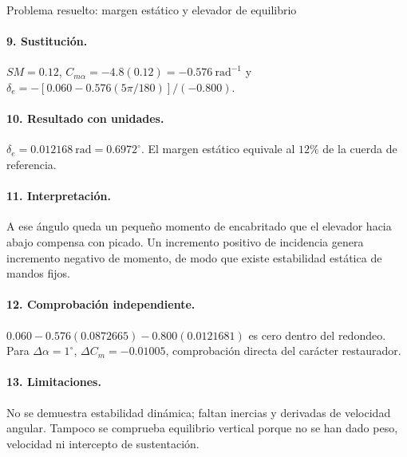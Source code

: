 \begin{studiumworked}{Problema resuelto: margen estático y elevador de equilibrio}
\paragraph{9. Sustitución.} $SM=0.12$, $C_{m\alpha}=-4.8(0.12)=-0.576\ \mathrm{rad^{-1}}$ y $\delta_e=-[0.060-0.576(5\pi/180)]/(-0.800)$.
\paragraph{10. Resultado con unidades.} $\delta_e=0.012168\ \mathrm{rad}=0.6972^\circ$. El margen estático equivale al $12\%$ de la cuerda de referencia.
\paragraph{11. Interpretación.} A ese ángulo queda un pequeño momento de encabritado que el elevador hacia abajo compensa con picado. Un incremento positivo de incidencia genera incremento negativo de momento, de modo que existe estabilidad estática de mandos fijos.
\paragraph{12. Comprobación independiente.} $0.060-0.576(0.0872665)-0.800(0.0121681)$ es cero dentro del redondeo. Para $\Delta\alpha=1^\circ$, $\Delta C_m=-0.01005$, comprobación directa del carácter restaurador.
\paragraph{13. Limitaciones.} No se demuestra estabilidad dinámica; faltan inercias y derivadas de velocidad angular. Tampoco se comprueba equilibrio vertical porque no se han dado peso, velocidad ni intercepto de sustentación.


\end{studiumworked}

